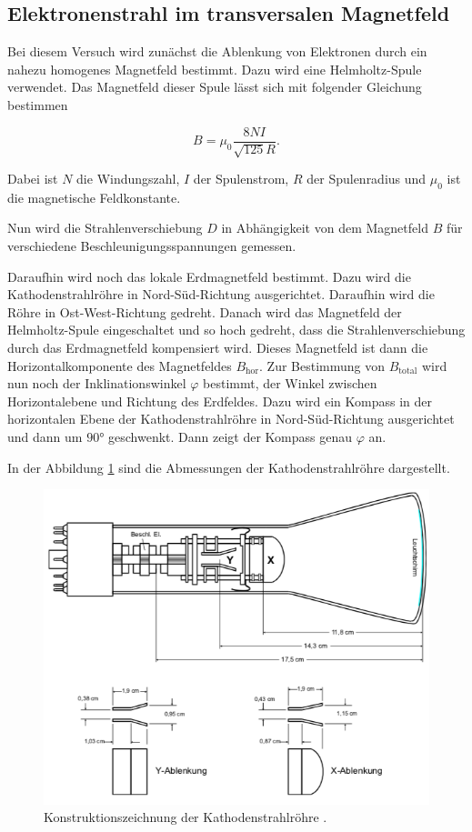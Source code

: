 \subsection{Elektronenstrahl im transversalen Magnetfeld}

Bei diesem Versuch wird zunächst die Ablenkung von Elektronen durch ein nahezu homogenes
Magnetfeld bestimmt. Dazu wird eine Helmholtz-Spule verwendet. Das Magnetfeld dieser
Spule lässt sich mit folgender Gleichung bestimmen

\begin{equation}
  B = \mu_0 \frac{8 N I}{\sqrt{125} R}.
  \label{eq:4}
\end{equation}

Dabei ist $N$ die Windungszahl, $I$ der Spulenstrom, $R$ der Spulenradius und
$\mu_0$ ist die magnetische Feldkonstante.

Nun wird die Strahlenverschiebung $D$ in Abhängigkeit von dem Magnetfeld $B$ für verschiedene
Beschleunigungsspannungen gemessen.

Daraufhin wird noch das lokale Erdmagnetfeld bestimmt. Dazu wird die Kathodenstrahlröhre
in Nord-Süd-Richtung ausgerichtet. Daraufhin wird die Röhre in Ost-West-Richtung gedreht.
Danach wird das Magnetfeld der Helmholtz-Spule eingeschaltet und so hoch gedreht, dass
die Strahlenverschiebung durch das Erdmagnetfeld kompensiert wird. Dieses Magnetfeld ist dann
die Horizontalkomponente des Magnetfeldes $B_\text{hor}$.
Zur Bestimmung von $B_\text{total}$ wird nun noch der Inklinationswinkel $\varphi$
bestimmt, der Winkel zwischen Horizontalebene und Richtung des Erdfeldes. Dazu wird
ein Kompass in der horizontalen Ebene der Kathodenstrahlröhre in Nord-Süd-Richtung ausgerichtet
und dann um $90°$ geschwenkt. Dann zeigt der Kompass genau $\varphi$ an.


In der Abbildung \ref{abb:5} sind die Abmessungen der Kathodenstrahlröhre dargestellt.

\begin{figure}[H]
  \centering
  \includegraphics[width=\textwidth]{content/Roehre.png}
  \caption{Konstruktionszeichnung der Kathodenstrahlröhre \cite{1}.}
  \label{abb:5}
\end{figure}
